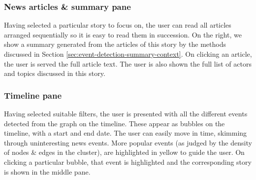 \subsubsection*{News articles \& summary pane}\label{sec:filter-summarization}
Having selected a particular story to focus on, the user can read all articles arranged sequentially so it is easy to read them in succession.
On the right, we show a summary generated from the articles of this story by the methods discussed in Section \ref{sec:event-detection-summary-context}.
On clicking an article, the user is served the full article text. The user is also shown the full list of actors and topics discussed in this story.
\subsubsection*{Timeline pane}
Having selected suitable filters, the user is presented with all the different events detected from the graph on the timeline. These appear as 
bubbles on the timeline, with a start and end date. The user can easily move in time, skimming through uninteresting news events.
More popular events (as judged by the density of nodes \& edges in the cluster), are highlighted in yellow to guide the user.
On clicking a particular bubble, that event is highlighted and the corresponding story is shown in the middle pane.

